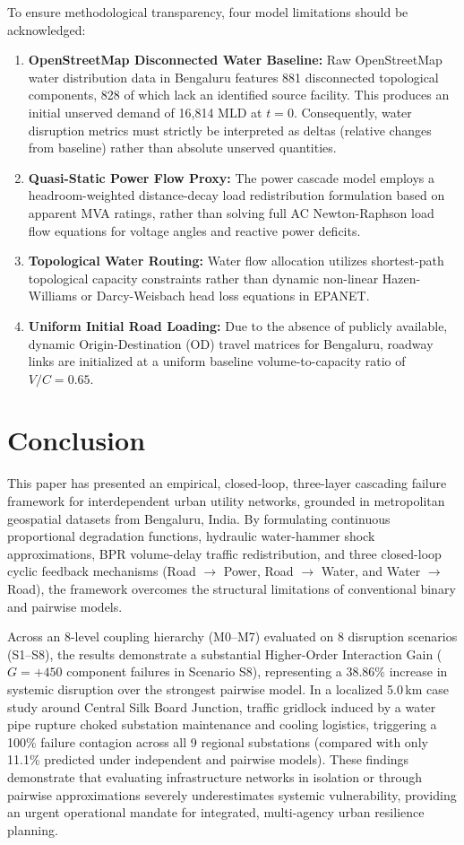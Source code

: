To ensure methodological transparency, four model limitations should be acknowledged:
\begin{enumerate}
    \item \textbf{OpenStreetMap Disconnected Water Baseline:} Raw OpenStreetMap water distribution data in Bengaluru features 881 disconnected topological components, 828 of which lack an identified source facility. This produces an initial unserved demand of 16,814 MLD at $t=0$. Consequently, water disruption metrics must strictly be interpreted as deltas (relative changes from baseline) rather than absolute unserved quantities.
    \item \textbf{Quasi-Static Power Flow Proxy:} The power cascade model employs a headroom-weighted distance-decay load redistribution formulation based on apparent MVA ratings, rather than solving full AC Newton-Raphson load flow equations for voltage angles and reactive power deficits.
    \item \textbf{Topological Water Routing:} Water flow allocation utilizes shortest-path topological capacity constraints rather than dynamic non-linear Hazen-Williams or Darcy-Weisbach head loss equations in EPANET.
    \item \textbf{Uniform Initial Road Loading:} Due to the absence of publicly available, dynamic Origin-Destination (OD) travel matrices for Bengaluru, roadway links are initialized at a uniform baseline volume-to-capacity ratio of $V/C = 0.65$.
\end{enumerate}

\section{Conclusion}
\label{sec:conclusion}

This paper has presented an empirical, closed-loop, three-layer cascading failure framework for interdependent urban utility networks, grounded in metropolitan geospatial datasets from Bengaluru, India. By formulating continuous proportional degradation functions, hydraulic water-hammer shock approximations, BPR volume-delay traffic redistribution, and three closed-loop cyclic feedback mechanisms (Road $\rightarrow$ Power, Road $\rightarrow$ Water, and Water $\rightarrow$ Road), the framework overcomes the structural limitations of conventional binary and pairwise models.

Across an 8-level coupling hierarchy (M0--M7) evaluated on 8 disruption scenarios (S1--S8), the results demonstrate a substantial Higher-Order Interaction Gain ($G = +450$ component failures in Scenario S8), representing a 38.86\% increase in systemic disruption over the strongest pairwise model. In a localized 5.0\,km case study around Central Silk Board Junction, traffic gridlock induced by a water pipe rupture choked substation maintenance and cooling logistics, triggering a 100\% failure contagion across all 9 regional substations (compared with only 11.1\% predicted under independent and pairwise models). These findings demonstrate that evaluating infrastructure networks in isolation or through pairwise approximations severely underestimates systemic vulnerability, providing an urgent operational mandate for integrated, multi-agency urban resilience planning.

